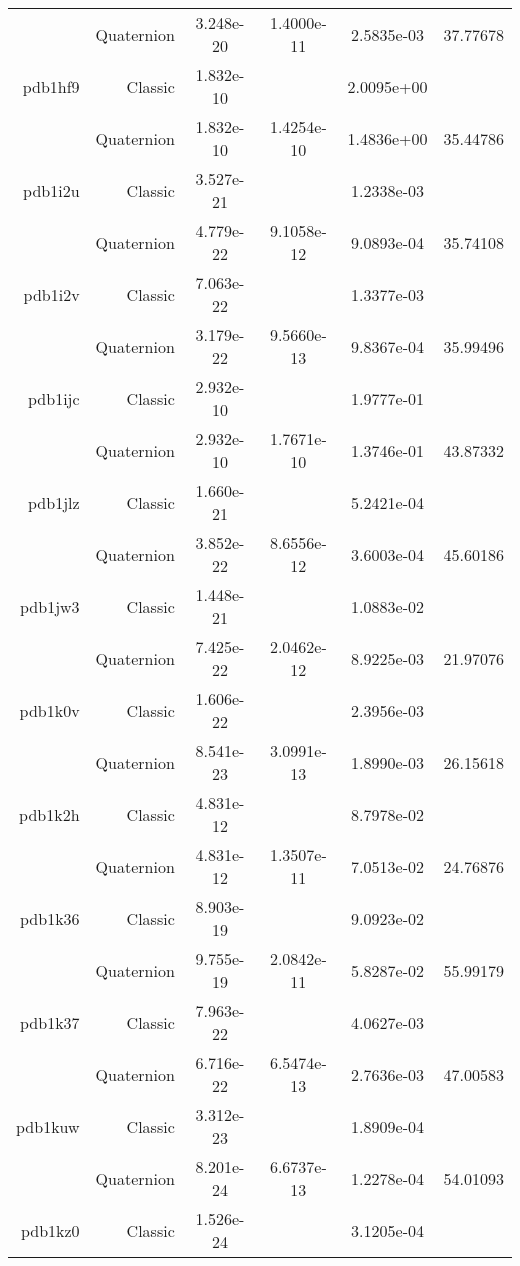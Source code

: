 \begin{xltabular}{\textwidth}{r|rS[table-format=1.3e+2]S[table-format=1.4e+2]S[table-format=1.4e+2]S[table-format=-1.5]}
& Quaternion & 3.248e-20 & 1.4000e-11 & 2.5835e-03 & 37.77678\\  \addlinespace
pdb1hf9 & Classic & 1.832e-10 &  & 2.0095e+00 & \\
& Quaternion & 1.832e-10 & 1.4254e-10 & 1.4836e+00 & 35.44786\\  \addlinespace
pdb1i2u & Classic & 3.527e-21 &  & 1.2338e-03 & \\
& Quaternion & 4.779e-22 & 9.1058e-12 & 9.0893e-04 & 35.74108\\  \addlinespace
pdb1i2v & Classic & 7.063e-22 &  & 1.3377e-03 & \\
& Quaternion & 3.179e-22 & 9.5660e-13 & 9.8367e-04 & 35.99496\\  \addlinespace
pdb1ijc & Classic & 2.932e-10 &  & 1.9777e-01 & \\
& Quaternion & 2.932e-10 & 1.7671e-10 & 1.3746e-01 & 43.87332\\  \addlinespace
pdb1jlz & Classic & 1.660e-21 &  & 5.2421e-04 & \\
& Quaternion & 3.852e-22 & 8.6556e-12 & 3.6003e-04 & 45.60186\\  \addlinespace
pdb1jw3 & Classic & 1.448e-21 &  & 1.0883e-02 & \\
& Quaternion & 7.425e-22 & 2.0462e-12 & 8.9225e-03 & 21.97076\\  \addlinespace
pdb1k0v & Classic & 1.606e-22 &  & 2.3956e-03 & \\
& Quaternion & 8.541e-23 & 3.0991e-13 & 1.8990e-03 & 26.15618\\  \addlinespace
pdb1k2h & Classic & 4.831e-12 &  & 8.7978e-02 & \\
& Quaternion & 4.831e-12 & 1.3507e-11 & 7.0513e-02 & 24.76876\\  \addlinespace
pdb1k36 & Classic & 8.903e-19 &  & 9.0923e-02 & \\
& Quaternion & 9.755e-19 & 2.0842e-11 & 5.8287e-02 & 55.99179\\  \addlinespace
pdb1k37 & Classic & 7.963e-22 &  & 4.0627e-03 & \\
& Quaternion & 6.716e-22 & 6.5474e-13 & 2.7636e-03 & 47.00583\\  \addlinespace
pdb1kuw & Classic & 3.312e-23 &  & 1.8909e-04 & \\
& Quaternion & 8.201e-24 & 6.6737e-13 & 1.2278e-04 & 54.01093\\  \addlinespace
pdb1kz0 & Classic & 1.526e-24 &  & 3.1205e-04 & \\

\end{xltabular}

